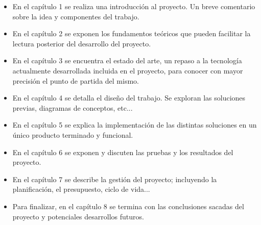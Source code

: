 \begin{itemize}
\item En el capítulo 1 se realiza una introducción al proyecto. Un breve comentario sobre la idea y componentes del trabajo.
\item En el capítulo 2 se exponen los fundamentos teóricos que pueden facilitar la lectura posterior del desarrollo del proyecto.
\item En el capítulo 3 se encuentra el estado del arte, un repaso a la tecnología actualmente desarrollada incluida en el proyecto, para conocer con mayor precisión el punto de partida del mismo.
\item En el capítulo 4 se detalla el diseño del trabajo. Se exploran las soluciones previas, diagramas de conceptos, etc...
\item En el capítulo 5 se explica la implementación de las distintas soluciones en un único producto terminado y funcional.
\item En el capítulo 6 se exponen y discuten las pruebas y los resultados del proyecto.
\item En el capítulo 7 se describe la gestión del proyecto; incluyendo la planificación, el presupuesto, ciclo de vida...
\item Para finalizar, en el capítulo 8 se termina con las conclusiones sacadas del proyecto y potenciales desarrollos futuros.
\end{itemize}
